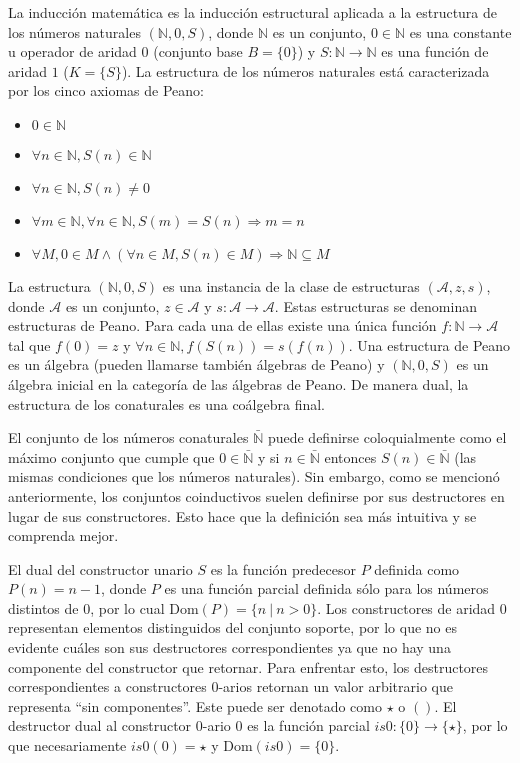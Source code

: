 La inducción matemática es la inducción estructural aplicada a la estructura de los números naturales $(\mathbb{N},0,S)$, donde $\mathbb{N}$ es un conjunto, $0 \in \mathbb{N}$ es una constante u operador de aridad $0$ (conjunto base $B = \{0\}$) y $S : \mathbb{N} \rightarrow \mathbb{N}$ es una función de aridad $1$ ($K = \{S\}$). La estructura de los números naturales está caracterizada por los cinco axiomas de Peano:
\begin{itemize}
\item $0 \in \mathbb{N}$
\item $\forall n \in \mathbb{N}, S(n) \in \mathbb{N}$
\item $\forall n \in \mathbb{N}, S(n) \neq 0$
\item $\forall m \in \mathbb{N}, \forall n \in \mathbb{N}, S(m) = S(n) \Rightarrow m = n$
\item $\forall M, 0 \in M \land (\forall n \in M, S(n) \in M) \Rightarrow \mathbb{N} \subseteq M$
\end{itemize}

La estructura $(\mathbb{N},0,S)$ es una instancia de la clase de estructuras $(\mathcal{A},z,s)$, donde $\mathcal{A}$ es un conjunto, $z \in \mathcal{A}$ y $s: \mathcal{A} \rightarrow \mathcal{A}$. Estas estructuras se denominan estructuras de Peano. Para cada una de ellas existe una única función $f : \mathbb{N} \rightarrow \mathcal{A}$ tal que $f(0) = z$ y $\forall n \in \mathbb{N}, f(S(n)) = s(f(n))$. Una estructura de Peano es un álgebra (pueden llamarse también álgebras de Peano) y $(\mathbb{N},0,S)$ es un álgebra inicial en la categoría de las álgebras de Peano.
De manera dual, la estructura de los conaturales es una coálgebra final. 

El conjunto de los números conaturales $\bar{\mathbb{N}}$ puede definirse coloquialmente como el máximo conjunto que cumple que $0 \in \bar{\mathbb{N}}$ y si $n \in \bar{\mathbb{N}}$ entonces $S(n) \in \bar{\mathbb{N}}$ (las mismas condiciones que los números naturales). Sin embargo, como se mencionó anteriormente, los conjuntos coinductivos suelen definirse por sus destructores en lugar de sus constructores. Esto hace que la definición sea más intuitiva y se comprenda mejor. 

El dual del constructor unario $S$ es la función predecesor $P$ definida como $P(n) = n-1$, donde $P$ es una función parcial definida sólo para los números distintos de $0$, por lo cual $\mathrm{Dom}(P) = \{n \ |\  n > 0\}$. Los constructores de aridad $0$ representan elementos distinguidos del conjunto soporte, por lo que no es evidente cuáles son sus destructores correspondientes ya que no hay una componente del constructor que retornar. Para enfrentar esto, los destructores correspondientes a constructores 0-arios retornan un valor arbitrario que representa ``sin componentes''. Este puede ser denotado como $\star$ o $()$. El destructor dual al constructor 0-ario $0$ es la función parcial $is0 : \{0\} \rightarrow \{\star\}$, por lo que necesariamente $is0(0) = \star$ y $\mathrm{Dom}(is0) = \{0\}$. 

